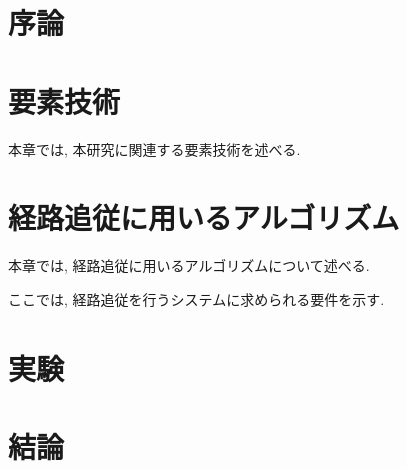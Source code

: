 \chapter{序論}
\label{chap:introduction}
%
%
%

\chapter{要素技術}
本章では, 本研究に関連する要素技術を述べる.

\chapter{経路追従に用いるアルゴリズム}
本章では, 経路追従に用いるアルゴリズムについて述べる.

ここでは, 経路追従を行うシステムに求められる要件を示す.
\chapter{実験}
\chapter{結論}
